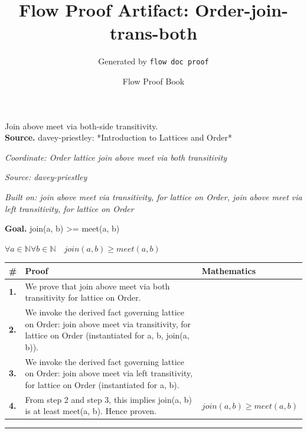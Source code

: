 \documentclass[11pt]{article}
\title{Flow Proof Artifact: Order-join-trans-both}
\author{Generated by \texttt{flow doc proof}}
\date{Flow Proof Book}
\theoremstyle{definition}
\begin{document}
\maketitle
Join above meet via both-side transitivity.\\[0.5em]
\textbf{Source.} davey-priestley: *Introduction to Lattices and Order*\\[0.5em]
\bigskip
{}\par
\smallskip\noindent\textit{Coordinate: Order \cdot lattice \cdot join above meet via both transitivity}\par
\smallskip\noindent\textit{Source: davey-priestley}\par
\smallskip\noindent\textit{Built on: join above meet via transitivity, for lattice on Order, join above meet via left transitivity, for lattice on Order}\par
\medskip
\noindent\textbf{Goal.} join(a, b) >= meet(a, b)\par
\noindent$\displaystyle \forall a \in \mathbb{N} \forall b \in \mathbb{N}\quad join(a, b) \ge meet(a, b)$\par
\medskip
\noindent
\begin{tabular}{@{} >{\raggedright\arraybackslash}p{} >{\raggedright\arraybackslash}p{} >{\raggedleft\arraybackslash}p{} @{}}
\textbf{\#} & \textbf{Proof} & \textbf{Mathematics} \\
\midrule
\textbf{1.} & We prove that join above meet via both transitivity for lattice on Order. & \\[0.45em]
\textbf{2.} & We invoke the derived fact governing lattice on Order: join above meet via transitivity, for lattice on Order (instantiated for a, b, join(a, b)). & \\[0.45em]
\textbf{3.} & We invoke the derived fact governing lattice on Order: join above meet via left transitivity, for lattice on Order (instantiated for a, b). & \\[0.45em]
\textbf{4.} & From step 2 and step 3, this implies join(a, b) is at least meet(a, b). Hence proven. & $\displaystyle join(a, b) \ge meet(a, b)$ \\[0.45em]
\bottomrule
\end{tabular}
\label{thm:Order-lattice-join_above_meet_via_both_transitivity}
\par\medskip\hrule
\end{document}

